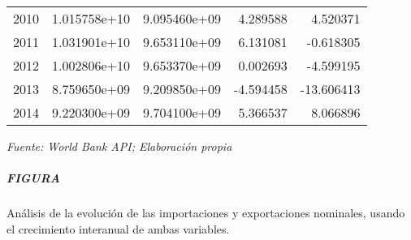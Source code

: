 \documentclass[12pt]{book}
\begin{document}
{\begin{tabular}{lrrrr}
2010 &                          1.015758e+10 &                          9.095460e+09 &                                      4.289588 &                                   4.520371 \\
2011 &                          1.031901e+10 &                          9.653110e+09 &                                      6.131081 &                                  -0.618305 \\
2012 &                          1.002806e+10 &                          9.653370e+09 &                                      0.002693 &                                  -4.599195 \\
2013 &                          8.759650e+09 &                          9.209850e+09 &                                     -4.594458 &                                 -13.606413 \\
2014 &                          9.220300e+09 &                          9.704100e+09 &                                      5.366537 &                                   8.066896 \\
\bottomrule
\end{tabular}
}



    \emph{Fuente: World Bank API; Elaboración propia}

    \subparagraph{FIGURA}\label{figura}

Análisis de la evolución de las importaciones y exportaciones nominales,
usando el crecimiento interanual de ambas variables.
\end{document}
